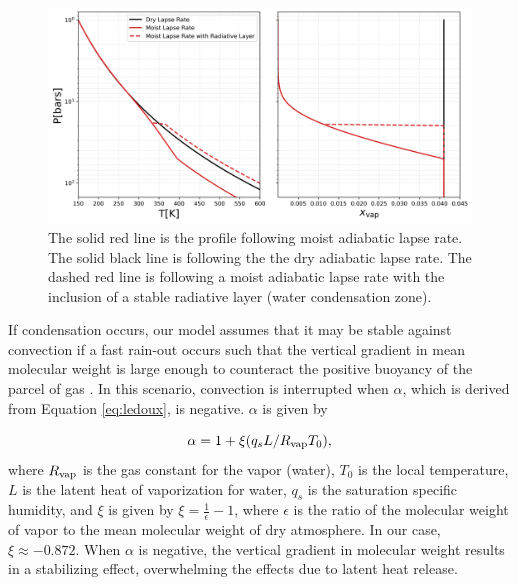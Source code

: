 \documentclass[11pt]{ucscthesisbs}
\begin{document}
\begin{figure}[ht!]
 \centerline{
  \includegraphics[width=6.5in]{figures/comparison_dry_vs_moist_lapse_rates.png}
 }
\caption[A Standard Interior Structure Model]
{The solid red line is the profile following moist adiabatic lapse rate. The solid black line is following the the dry adiabatic lapse rate. The dashed red line is following a moist adiabatic lapse rate with the inclusion of a stable radiative layer (water condensation zone).} 
\label{fig:comparison_adiabatic_profiles}
\end{figure}


If condensation occurs, our model assumes that it may be stable against convection if a fast rain-out occurs such that the vertical gradient in mean molecular weight is large enough to counteract the positive buoyancy of the parcel of gas \citep{leconte_2017, friedson_2017}. In this scenario, convection is interrupted when $\alpha$, which is derived from Equation \ref{eq:ledoux}, is negative. $\alpha$ \citep{friedson_2017} is given by

\begin{equation}
  \alpha = 1 + \xi (q_{s} L / R_{\rm vap} T_{0}) ,
  \label{eq:alpha}
\end{equation}
where $R_{\rm vap}$ is the gas constant for the vapor (water), $T_{0}$ is the local temperature, $L$ is the latent heat of vaporization for water, $q_{s}$ is the saturation specific humidity, and $\xi$ is given by $\xi = \frac{1}{\epsilon} - 1$, where $\epsilon$ is the ratio of the molecular weight of vapor to the mean molecular weight of dry atmosphere. In our case, $\xi \approx -0.872$. When $\alpha$ is negative, the vertical gradient in molecular weight results in a stabilizing effect, overwhelming the effects due to latent heat release.
\end{document}
